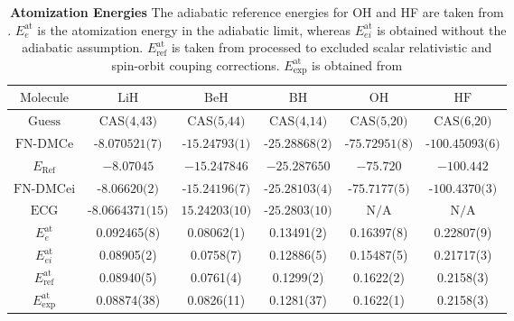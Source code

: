 \documentclass[aps,prl,superscriptaddress,groupedaddress]{revtex4}
\begin{document}
\begin{table}[htpb!]
\setlength{\extrarowheight}{3pt}
\begin{tabular}{*{1}{*{6}{c}}}
\hline\hline
$\text{Molecule}$ & $\text{LiH}$ & $\text{BeH}$ & $\text{BH}$ & $\text{OH}$ & $\text{HF}$ \\ \hline
$\text{Guess}$ & $\text{CAS(4,43)}$ & $\text{CAS(5,44)}$ & $\text{CAS(4,14)}$ & $\text{CAS(5,20)}$ & $\text{CAS(6,20)}$ \\
$\text{FN-DMCe}$ & $\text{-8.070521(7)}$ & $\text{-15.24793(1)}$ & $\text{-25.28868(2)}$ & $\text{-75.72951(8)}$ & $\text{-100.45093(6)}$ \\
$E_{\text{Ref}}$ & $-8.07045$ & $-15.247846$ & $-25.287650$ & $-75.720$ & $-100.442$ \\
$\text{FN-DMCei}$ & $\text{-8.06620(2)}$ & $\text{-15.24196(7)}$ & $\text{-25.28103(4)}$ & $\text{-75.7177(5)}$ & $\text{-100.4370(3)}$ \\
$\text{ECG}$ & $\text{-8.0664371(15)}$ & $\text{15.24203(10)}$ & $\text{-25.2803(10)}$ & $\text{N/A}$ & $\text{N/A}$ \\
\hline
$E^{\text{at}}_{e}$ & 0.092465(8) & 0.08062(1) & 0.13491(2) & 0.16397(8) & 0.22807(9) \\
$E^{\text{at}}_{ei}$ & 0.08905(2)  & 0.0758(7)  & 0.12886(5) & 0.15487(5) & 0.21717(3) \\
$E^{\text{at}}_{\text{ref}}$ & 0.08940(5) & 0.0761(4) & 0.1299(2) & 0.1622(2) & 0.2158(3)\\
$E^{\text{at}}_{\text{exp}}$ & 0.08874(38) & 0.0826(11) & 0.1281(37) & 0.1622(1) & 0.2158(3) \\
\hline\hline
\end{tabular}
\caption{\textbf{Atomization Energies} The adiabatic reference energies for OH and HF are taken from \cite{Lee_Bench}. $E^{\text{at}}_{e}$ is the atomization energy in the adiabatic limit, whereas $E^{\text{at}}_{ei}$ is obtained without the adiabatic assumption. $E^{\text{at}}_{\text{ref}}$ is taken from \cite{Feller_Corrections} processed to excluded scalar relativistic and spin-orbit couping corrections. $E^{\text{at}}_{\text{exp}}$ is obtained from \cite{CCCBDB} \label{tab:atomization}}
\end{table} 
\end{document}
